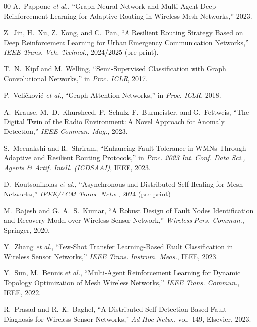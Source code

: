 \documentclass[conference]{IEEEtran}
\begin{document}
\begin{thebibliography}{00}
A.~Pappone \textit{et al.}, ``Graph Neural Network and Multi-Agent Deep Reinforcement Learning for Adaptive Routing in Wireless Mesh Networks,'' 2023.

Z.~Jin, H.~Xu, Z.~Kong, and C.~Pan, ``A Resilient Routing Strategy Based on Deep Reinforcement Learning for Urban Emergency Communication Networks,'' \textit{IEEE Trans. Veh. Technol.}, 2024/2025 (pre-print).

T.~N.~Kipf and M.~Welling, ``Semi-Supervised Classification with Graph Convolutional Networks,'' in \textit{Proc. ICLR}, 2017.

P.~Veli\v{c}kovi\'{c} \textit{et al.}, ``Graph Attention Networks,'' in \textit{Proc. ICLR}, 2018.

A.~Krause, M.~D.~Khursheed, P.~Schulz, F.~Burmeister, and G.~Fettweis, ``The Digital Twin of the Radio Environment: A Novel Approach for Anomaly Detection,'' \textit{IEEE Commun. Mag.}, 2023.

S.~Meenakshi and R.~Shriram, ``Enhancing Fault Tolerance in WMNs Through Adaptive and Resilient Routing Protocols,'' in \textit{Proc. 2023 Int. Conf. Data Sci., Agents \& Artif. Intell. (ICDSAAI)}, IEEE, 2023.

D.~Koutsonikolas \textit{et al.}, ``Asynchronous and Distributed Self-Healing for Mesh Networks,'' \textit{IEEE/ACM Trans. Netw.}, 2024 (pre-print).

M.~Rajesh and G.~A.~S.~Kumar, ``A Robust Design of Fault Nodes Identification and Recovery Model over Wireless Sensor Network,'' \textit{Wireless Pers. Commun.}, Springer, 2020.

Y.~Zhang \textit{et al.}, ``Few-Shot Transfer Learning-Based Fault Classification in Wireless Sensor Networks,'' \textit{IEEE Trans. Instrum. Meas.}, IEEE, 2023.

Y.~Sun, M.~Bennis \textit{et al.}, ``Multi-Agent Reinforcement Learning for Dynamic Topology Optimization of Mesh Wireless Networks,'' \textit{IEEE Trans. Commun.}, IEEE, 2022.



R.~Prasad and R.~K.~Baghel, ``A Distributed Self-Detection Based Fault Diagnosis for Wireless Sensor Networks,'' \textit{Ad Hoc Netw.}, vol.~149, Elsevier, 2023.




\end{thebibliography}
\end{document}
